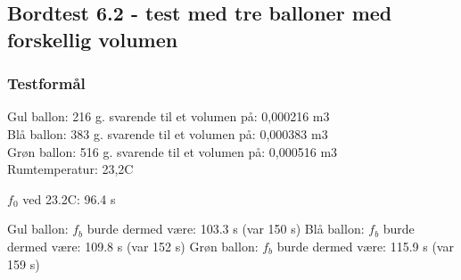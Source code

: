 \subsection{Bordtest 6.2 - test med tre balloner med forskellig volumen}

\subsubsection{Testformål}
	

Gul ballon: 216 g. svarende til et volumen på: 0,000216 m3\\ 
Blå ballon: 383 g. svarende til et volumen på: 0,000383 m3\\
Grøn ballon: 516 g. svarende til et volumen på: 0,000516 m3\\

Rumtemperatur: 23,2\degree C

		
	
$f_{0}$ ved 23.2\degree C: 96.4 s

Gul ballon: $f_{b}$ burde dermed være: 103.3 s (var 150 s) 
Blå ballon: $f_{b}$ burde dermed være: 109.8 s (var 152 s)
Grøn ballon: $f_{b}$ burde dermed være: 115.9 s (var 159 s) 		
	
	
	

	